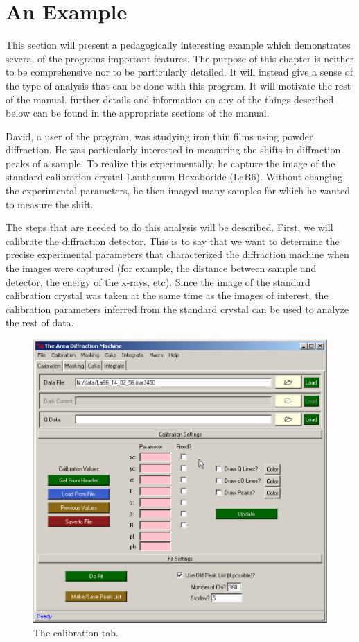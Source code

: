 \chapter{An Example}
This section will present a pedagogically interesting 
example which demonstrates several of the programs important
features.  The purpose of this chapter is neither to be 
comprehensive nor to be particularly detailed. It will instead 
give a sense of the type of analysis that can be done with 
this program. It will motivate the rest of the manual. further details 
and information on any of the things described below can be found in 
the appropriate sections of the manual.

David, a user of the program, was studying iron thin films 
using powder diffraction. He was particularly interested in 
measuring the shifts in diffraction peaks of a sample. To 
realize this experimentally, he capture the image of the 
standard calibration crystal Lanthanum Hexaboride (LaB6). 
Without changing the experimental parameters, he then imaged 
many samples for which he wanted to measure the shift.

The steps that are needed to do this analysis will be
described. First, we will calibrate the diffraction detector.
This is to say that we want to determine the precise 
experimental parameters that characterized the diffraction
machine when the images were captured (for example, the distance
between sample and detector, the energy of the x-rays, etc). Since 
the image of the standard calibration crystal was taken at the same
time as the images of interest, the calibration parameters inferred
from the standard crystal can be used to analyze the
rest of data.

\begin{figure}
    \centering
    \includegraphics[scale=.75]{figures/calibration_tab.eps}
    \caption{The calibration tab.}
    \label{calibration_tab_example}
\end{figure}

